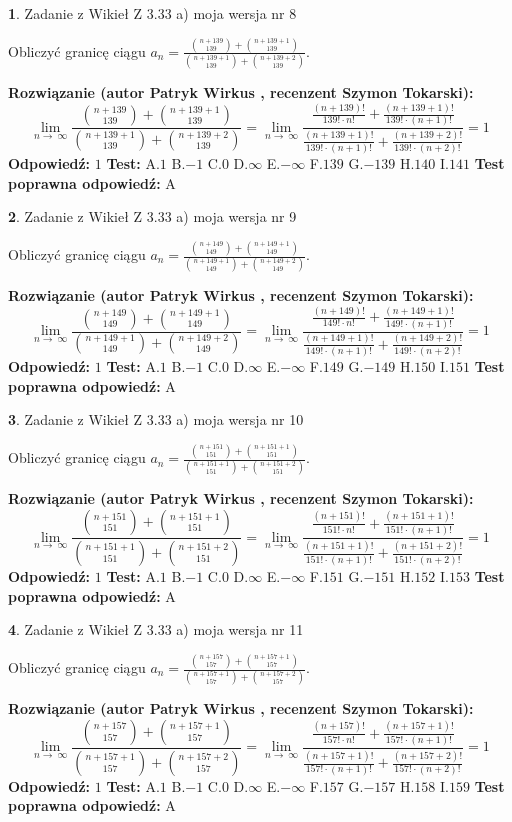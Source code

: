 \documentclass[12pt, a4paper]{article}
\theoremstyle{definition} %
\newtheorem{zad}{}
\newcommand{\zadStart}[1]{\begin{zad}#1\newline}
\newcommand{\zadStop}{\end{zad}}
\newcommand{\rozwStart}[2]{\noindent \textbf{Rozwiązanie (autor #1 , recenzent #2): }\newline}
\newcommand{\rozwStop}{\newline}
\newcommand{\odpStart}{\noindent \textbf{Odpowiedź:}\newline}
\newcommand{\odpStop}{\newline}
\newcommand{\testStart}{\noindent \textbf{Test:}\newline}
\newcommand{\testStop}{\newline}
\newcommand{\kluczStart}{\noindent \textbf{Test poprawna odpowiedź:}\newline}
\newcommand{\kluczStop}{\newline}
\begin{document}
\zadStart{Zadanie z Wikieł Z 3.33 a) moja wersja nr 8}

Obliczyć granicę ciągu $a_{n}=\frac{{n+139\choose139}+{n+139+1\choose139}}{{n+139+1\choose139}+{n+139+2\choose139}}$.
\zadStop
\rozwStart{Patryk Wirkus}{Szymon Tokarski}
$$\lim\limits_{n\to\ \infty}\frac{{n+139\choose139}+{n+139+1\choose139}}{{n+139+1\choose139}+{n+139+2\choose139}} = \lim\limits_{n\to\ \infty}\frac{\frac{(n+139)!}{139! \cdot n!}+\frac{(n+139+1)!}{139! \cdot (n+1)!}}{\frac{(n+139+1)!}{139! \cdot (n+1)!}+\frac{(n+139+2)!}{139! \cdot (n+2)!}} = 1$$
\rozwStop
\odpStart
$1$
\odpStop
\testStart
A.$1$ B.$-1$ C.$0$ D.$\infty$ E.$-\infty$
F.$139$ G.$-139$
H.$140$
I.$141$
\testStop
\kluczStart
A
\kluczStop



\zadStart{Zadanie z Wikieł Z 3.33 a) moja wersja nr 9}

Obliczyć granicę ciągu $a_{n}=\frac{{n+149\choose149}+{n+149+1\choose149}}{{n+149+1\choose149}+{n+149+2\choose149}}$.
\zadStop
\rozwStart{Patryk Wirkus}{Szymon Tokarski}
$$\lim\limits_{n\to\ \infty}\frac{{n+149\choose149}+{n+149+1\choose149}}{{n+149+1\choose149}+{n+149+2\choose149}} = \lim\limits_{n\to\ \infty}\frac{\frac{(n+149)!}{149! \cdot n!}+\frac{(n+149+1)!}{149! \cdot (n+1)!}}{\frac{(n+149+1)!}{149! \cdot (n+1)!}+\frac{(n+149+2)!}{149! \cdot (n+2)!}} = 1$$
\rozwStop
\odpStart
$1$
\odpStop
\testStart
A.$1$ B.$-1$ C.$0$ D.$\infty$ E.$-\infty$
F.$149$ G.$-149$
H.$150$
I.$151$
\testStop
\kluczStart
A
\kluczStop



\zadStart{Zadanie z Wikieł Z 3.33 a) moja wersja nr 10}

Obliczyć granicę ciągu $a_{n}=\frac{{n+151\choose151}+{n+151+1\choose151}}{{n+151+1\choose151}+{n+151+2\choose151}}$.
\zadStop
\rozwStart{Patryk Wirkus}{Szymon Tokarski}
$$\lim\limits_{n\to\ \infty}\frac{{n+151\choose151}+{n+151+1\choose151}}{{n+151+1\choose151}+{n+151+2\choose151}} = \lim\limits_{n\to\ \infty}\frac{\frac{(n+151)!}{151! \cdot n!}+\frac{(n+151+1)!}{151! \cdot (n+1)!}}{\frac{(n+151+1)!}{151! \cdot (n+1)!}+\frac{(n+151+2)!}{151! \cdot (n+2)!}} = 1$$
\rozwStop
\odpStart
$1$
\odpStop
\testStart
A.$1$ B.$-1$ C.$0$ D.$\infty$ E.$-\infty$
F.$151$ G.$-151$
H.$152$
I.$153$
\testStop
\kluczStart
A
\kluczStop



\zadStart{Zadanie z Wikieł Z 3.33 a) moja wersja nr 11}

Obliczyć granicę ciągu $a_{n}=\frac{{n+157\choose157}+{n+157+1\choose157}}{{n+157+1\choose157}+{n+157+2\choose157}}$.
\zadStop
\rozwStart{Patryk Wirkus}{Szymon Tokarski}
$$\lim\limits_{n\to\ \infty}\frac{{n+157\choose157}+{n+157+1\choose157}}{{n+157+1\choose157}+{n+157+2\choose157}} = \lim\limits_{n\to\ \infty}\frac{\frac{(n+157)!}{157! \cdot n!}+\frac{(n+157+1)!}{157! \cdot (n+1)!}}{\frac{(n+157+1)!}{157! \cdot (n+1)!}+\frac{(n+157+2)!}{157! \cdot (n+2)!}} = 1$$
\rozwStop
\odpStart
$1$
\odpStop
\testStart
A.$1$ B.$-1$ C.$0$ D.$\infty$ E.$-\infty$
F.$157$ G.$-157$
H.$158$
I.$159$
\testStop
\kluczStart
A
\kluczStop
\end{document}
